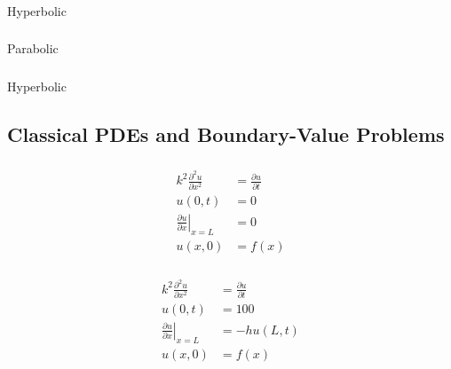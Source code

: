 \documentclass{article}
\begin{document}
\setcounter{subsubsection}{20}
\subsubsection{}

Hyperbolic

\setcounter{subsubsection}{22}
\subsubsection{}

Parabolic

\setcounter{subsubsection}{24}
\subsubsection{}

Hyperbolic

\subsection{Classical PDEs and Boundary-Value Problems}

\subsubsection{}

\begin{align*}
  k^2 \frac{\partial^2 u}{\partial x^2}                & = \frac{\partial u}{\partial t} \\
  u(0, t)                                              & = 0                             \\
  \left. \frac{\partial u}{\partial x} \right|_{x = L} & = 0                             \\
  u(x, 0)                                              & = f(x)
\end{align*}

\setcounter{subsubsection}{2}
\subsubsection{}

\begin{align*}
  k^2 \frac{\partial^2 u}{\partial x^2}                & = \frac{\partial u}{\partial t} \\
  u(0, t)                                              & = 100                           \\
  \left. \frac{\partial u}{\partial x} \right|_{x = L} & = -h u(L, t)                    \\
  u(x, 0)                                              & = f(x)
\end{align*}
\end{document}
